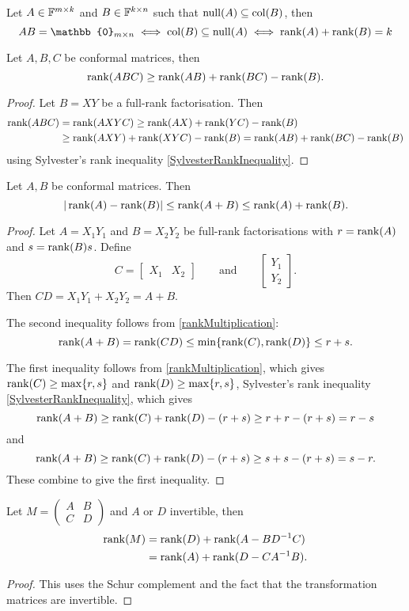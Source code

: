 \begin{corollary}
Let $A\in\mathbb{F}^{m\times k}$ and $B\in\mathbb{F}^{k\times n}$ such that $\operatorname{null}(A)\subseteq \operatorname{col}(B)$, then
\[ AB = \mathbb{0}_{m\times n} \iff \Col(B)\subseteq \Null(A) \iff \Rank(A) + \Rank(B) = k \]
\end{corollary}

\begin{proposition}
Let $A,B,C$ be conformal matrices, then
\[ \operatorname{rank}(ABC) \geq \operatorname{rank}(AB)+\operatorname{rank}(BC) - \operatorname{rank}(B). \]
\end{proposition}
\begin{proof}
Let $B = XY$ be a full-rank factorisation. Then
\begin{align*}
\operatorname{rank}(ABC) &= \operatorname{rank}(AXYC) \geq \operatorname{rank}(AX) + \operatorname{rank}(YC) - \operatorname{rank}(B) \\
&\geq \operatorname{rank}(AXY) + \operatorname{rank}(XYC) - \operatorname{rank}(B) = \operatorname{rank}(AB)+\operatorname{rank}(BC) - \operatorname{rank}(B)
\end{align*}
using Sylvester's rank inequality \ref{SylvesterRankInequality}.
\end{proof}

\begin{proposition}
Let $A,B$ be conformal matrices. Then
\[ |\operatorname{rank}(A)-\operatorname{rank}(B)|\leq\operatorname{rank}(A+B)\leq \operatorname{rank}(A) + \operatorname{rank}(B). \]
\end{proposition}
\begin{proof}
Let $A=X_1Y_1$ and $B=X_2Y_2$ be full-rank factorisations with $r = \operatorname{rank}(A)$ and $s=\operatorname{rank}(B)s$. Define
\[ C = \begin{bmatrix}
X_1 & X_2
\end{bmatrix}\qquad\text{and}\qquad \begin{bmatrix}
Y_1 \\ Y_2
\end{bmatrix}. \]
Then $CD = X_1Y_1 + X_2Y_2 = A+B$.

The second inequality follows from \ref{rankMultiplication}:
\[ \operatorname{rank}(A+B) = \operatorname{rank}(CD) \leq \min\{\operatorname{rank}(C),\operatorname{rank}(D)\} \leq r+s. \]

The first inequality follows from \ref{rankMultiplication}, which gives $\operatorname{rank}(C)\geq\max\{r,s\}$ and $\operatorname{rank}(D)\geq\max\{r,s\}$, Sylvester's rank inequality \ref{SylvesterRankInequality}, which gives
\[ \operatorname{rank}(A+B) \geq \operatorname{rank}(C) + \operatorname{rank}(D) - (r+s) \geq r+r-(r+s) = r-s \]
and
\[ \operatorname{rank}(A+B) \geq \operatorname{rank}(C) + \operatorname{rank}(D) - (r+s) \geq s+s-(r+s) = s-r. \]
These combine to give the first inequality.
\end{proof}

\begin{proposition}
Let $M=\begin{pmatrix}
A & B \\ C & D
\end{pmatrix}$ and $A$ or $D$ invertible, then
\begin{align*}
\operatorname{rank}(M) &= \operatorname{rank}(D) + \operatorname{rank}(A-BD^{-1}C) \\
&= \operatorname{rank}(A) + \operatorname{rank}(D-CA^{-1}B).
\end{align*}
\end{proposition}
\begin{proof}
This uses the Schur complement and the fact that the transformation matrices are invertible.
\end{proof}

